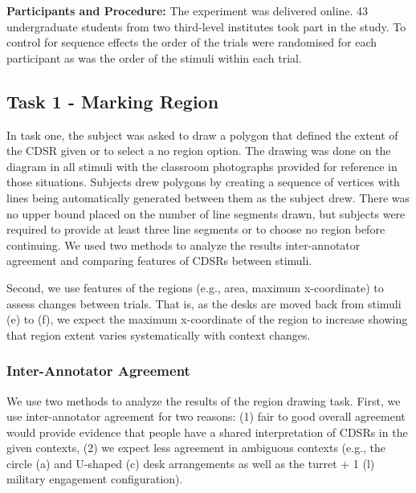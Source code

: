 \documentclass[11pt,letterpaper]{article}
\begin{document}
\textbf{Participants and Procedure:} The experiment was delivered online. 43 undergraduate students from two third-level institutes took part in the study. To control for sequence effects the order of the trials were randomised for each participant as was the order of the stimuli within each trial.   

\subsection{Task 1 - Marking Region}
In task one, the subject was asked to draw a polygon that defined the extent of the CDSR given or to select a no region option.  The drawing was done on the diagram in all stimuli with the classroom photographs provided for reference in those situations.  Subjects drew polygons by creating a sequence of vertices with lines being automatically generated between them as the subject drew.  There was no upper bound placed on the number of line segments drawn, but subjects were required to provide at least three line segments or to choose no region before continuing.  We used two methods to analyze the results inter-annotator agreement and comparing features of CDSRs between stimuli. 


Second, we use features of the regions (e.g., area, maximum x-coordinate) to assess changes between trials.  That is, as the desks are moved back from stimuli (e) to (f), we expect the maximum x-coordinate of the region to increase showing that region extent varies systematically with context changes.

\subsubsection{Inter-Annotator Agreement}

We use two methods to analyze the results of the region drawing task.  First, we use inter-annotator agreement for two reasons: (1) fair to good overall agreement would provide evidence that people have a shared interpretation of CDSRs in the given contexts, (2) we expect less agreement in ambiguous contexts (e.g., the circle (a) and U-shaped (c) desk arrangements as well as the turret + 1 (l) military engagement configuration).
\end{document}
